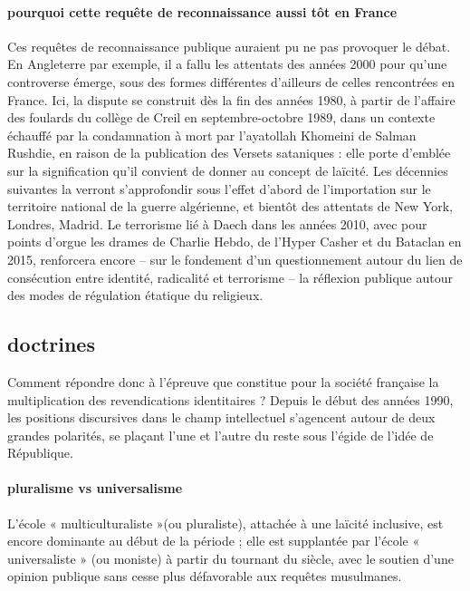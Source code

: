 \paragraph{pourquoi cette requête de reconnaissance aussi tôt en France}
Ces requêtes de reconnaissance publique auraient pu ne pas provoquer le débat. En Angleterre par exemple, il a fallu les attentats des années 2000 pour qu’une controverse émerge, sous des formes différentes d’ailleurs de celles rencontrées en France. Ici, la dispute se construit dès la fin des années 1980, à partir de l’affaire des foulards du collège de Creil en septembre-octobre 1989, dans un contexte échauffé par la condamnation
à mort par l’ayatollah Khomeini de Salman Rushdie, en raison de la publication des Versets sataniques : elle porte d’emblée sur la signification qu’il convient de donner au concept de laïcité. Les décennies suivantes la verront s’approfondir sous l’effet d’abord de l’importation sur le territoire national de la guerre algérienne, et bientôt des attentats de New York, Londres, Madrid. Le terrorisme lié à Daech dans les années 2010, avec pour points d’orgue les drames de Charlie Hebdo, de l’Hyper Casher et du Bataclan en 2015, renforcera encore – sur le fondement d’un questionnement autour du lien de consécution entre identité, radicalité et terrorisme – la réflexion publique autour des modes de régulation étatique du religieux.

\subsection{doctrines}
Comment répondre donc à l’épreuve que constitue pour la société française la multiplication des revendications identitaires ? Depuis le début des années 1990, les positions discursives dans le champ intellectuel s’agencent autour de deux grandes polarités, se plaçant l’une et l’autre du reste sous l’égide de l’idée de République. 
\paragraph{pluralisme vs universalisme} L’école « multiculturaliste »(ou pluraliste), attachée à une laïcité inclusive, est encore dominante au début de la période ; elle est supplantée par l’école « universaliste » (ou moniste) à partir du tournant du siècle, avec le soutien d’une opinion publique sans cesse plus défavorable aux requêtes musulmanes.


